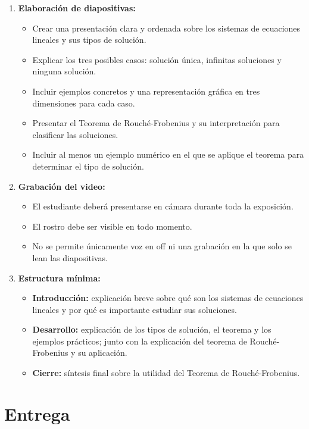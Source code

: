 \documentclass[a4,11pt]{aleph-notas}
\begin{document}
\begin{enumerate}
    \item \textbf{Elaboración de diapositivas:}
    \begin{itemize}
        \item Crear una presentación clara y ordenada sobre los sistemas de ecuaciones lineales y sus tipos de solución.
        \item Explicar los tres posibles casos: solución única, infinitas soluciones y ninguna solución.
        \item Incluir ejemplos concretos y una representación gráfica en tres dimensiones para cada caso.
        \item Presentar el Teorema de Rouché-Frobenius y su interpretación para clasificar las soluciones.
        \item Incluir al menos un ejemplo numérico en el que se aplique el teorema para determinar el tipo de solución.
    \end{itemize}

    \item \textbf{Grabación del video:}
    \begin{itemize}
        \item El estudiante deberá presentarse en cámara durante toda la exposición.
        \item El rostro debe ser visible en todo momento.
        \item No se permite únicamente voz en off ni una grabación en la que solo se lean las diapositivas.
    \end{itemize}

    \item \textbf{Estructura mínima:}
    \begin{itemize}
        \item \textbf{Introducción:} explicación breve sobre qué son los sistemas de ecuaciones lineales y por qué es importante estudiar sus soluciones.
        \item \textbf{Desarrollo:} explicación de los tipos de solución, el teorema y los ejemplos prácticos; junto con la explicación del teorema de Rouché-Frobenius y su aplicación.
        \item \textbf{Cierre:} síntesis final sobre la utilidad del Teorema de Rouché-Frobenius.
    \end{itemize}
\end{enumerate}

\section{Entrega}
\end{document}
